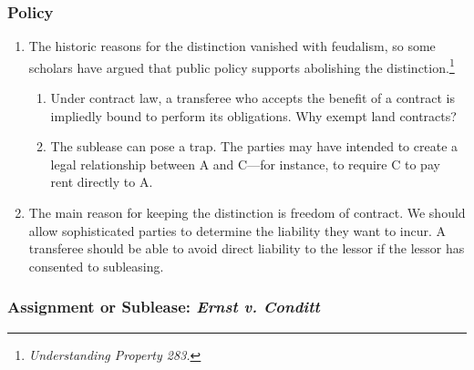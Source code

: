 \subsubsection{Policy}

\begin{enumerate}
    \item The historic reasons for the distinction vanished with feudalism, so 
    some scholars have argued that public policy supports abolishing the 
    distinction.\footnote{\emph{Understanding Property 283.}}
    \begin{enumerate}
        \item Under contract law, a transferee who accepts the benefit of a 
        contract is impliedly bound to perform its obligations. Why exempt 
        land contracts?
        \item The sublease can pose a trap. The parties may have intended to 
        create a legal relationship between A and C---for instance, to require 
        C to pay rent directly to A.
    \end{enumerate}
    \item The main reason for keeping the distinction is freedom of contract. 
    We should allow sophisticated parties to determine the liability they want 
    to incur. A transferee should be able to avoid direct liability to the 
    lessor if the lessor has consented to subleasing.
\end{enumerate}

\subsubsection{Assignment or Sublease: \emph{Ernst v. Conditt}}

